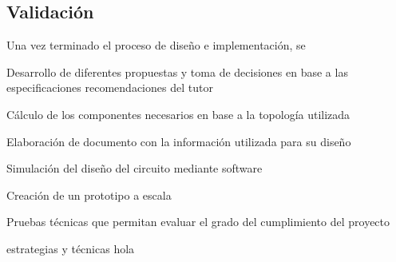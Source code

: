 \subsection{Validación}
Una vez terminado el proceso de diseño e implementación, se 

Desarrollo de diferentes propuestas y toma de decisiones en base a las especificaciones recomendaciones del tutor

Cálculo de los componentes necesarios en base a la topología utilizada

Elaboración de documento con la información utilizada para su diseño 

Simulación del diseño del circuito mediante software

Creación de un prototipo a escala

Pruebas técnicas que permitan evaluar el grado del cumplimiento del proyecto

estrategias y técnicas hola